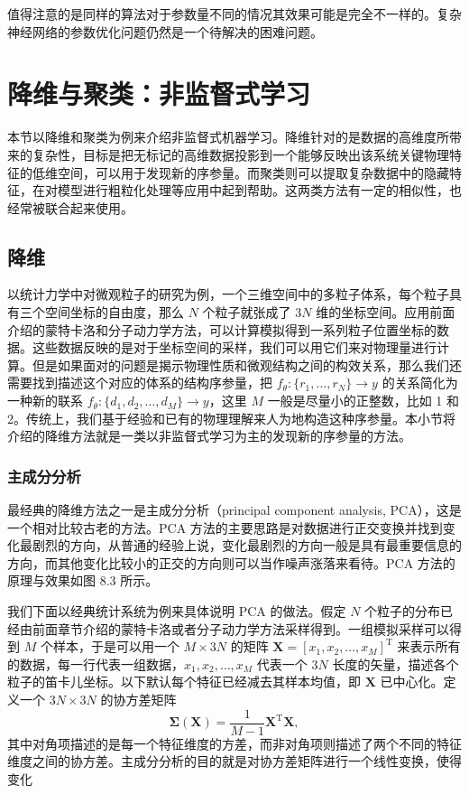 值得注意的是同样的算法对于参数量不同的情况其效果可能是完全不一样的。复杂神经网络的参数优化问题仍然是一个待解决的困难问题。

\section{降维与聚类：非监督式学习}
本节以降维和聚类为例来介绍非监督式机器学习。降维针对的是数据的高维度所带来的复杂性，目标是把无标记的高维数据投影到一个能够反映出该系统关键物理特征的低维空间，可以用于发现新的序参量。而聚类则可以提取复杂数据中的隐藏特征，在对模型进行粗粒化处理等应用中起到帮助。这两类方法有一定的相似性，也经常被联合起来使用。

\subsection{降维}
以统计力学中对微观粒子的研究为例，一个三维空间中的多粒子体系，每个粒子具有三个空间坐标的自由度，那么 $N$ 个粒子就张成了 $3N$ 维的坐标空间。应用前面介绍的蒙特卡洛和分子动力学方法，可以计算模拟得到一系列粒子位置坐标的数据。这些数据反映的是对于坐标空间的采样，我们可以用它们来对物理量进行计算。但是如果面对的问题是揭示物理性质和微观结构之间的构效关系，那么我们还需要找到描述这个对应的体系的结构序参量，把 $f_\theta:\{r_1,\ldots,r_N\}\to y$ 的关系简化为一种新的联系 $f_\theta:\{d_1,d_2,\ldots,d_M\}\to y$，这里 $M$ 一般是尽量小的正整数，比如 1 和 2。传统上，我们基于经验和已有的物理理解来人为地构造这种序参量。本小节将介绍的降维方法就是一类以非监督式学习为主的发现新的序参量的方法。

\subsubsection{主成分分析}
最经典的降维方法之一是主成分分析（principal component analysis, PCA），这是一个相对比较古老的方法。PCA 方法的主要思路是对数据进行正交变换并找到变化最剧烈的方向，从普通的经验上说，变化最剧烈的方向一般是具有最重要信息的方向，而其他变化比较小的正交的方向则可以当作噪声涨落来看待。PCA 方法的原理与效果如图 8.3 所示。

我们下面以经典统计系统为例来具体说明 PCA 的做法。假定 $N$ 个粒子的分布已经由前面章节介绍的蒙特卡洛或者分子动力学方法采样得到。一组模拟采样可以得到 $M$ 个样本，于是可以用一个 $M\times3N$ 的矩阵 $\mathbf X=[x_1,x_2,\ldots,x_M]^\mathrm T$ 来表示所有的数据，每一行代表一组数据，$x_1,x_2,\ldots,x_M$ 代表一个 $3N$ 长度的矢量，描述各个粒子的笛卡儿坐标。以下默认每个特征已经减去其样本均值，即 $\mathbf X$ 已中心化。定义一个 $3N\times3N$ 的协方差矩阵
\begin{equation}
\bm\Sigma(\mathbf X)=\frac1{M-1}\mathbf X^{\mathrm T}\mathbf X,
\tag{8.2.1}
\end{equation}
其中对角项描述的是每一个特征维度的方差，而非对角项则描述了两个不同的特征维度之间的协方差。主成分分析的目的就是对协方差矩阵进行一个线性变换，使得变化


